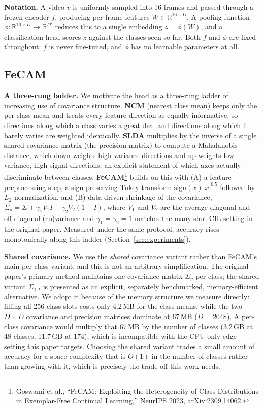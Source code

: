 \documentclass[11pt]{article}
\begin{document}
\textbf{Notation.} A video $v$ is uniformly sampled into 16 frames and
passed through a frozen encoder $f$, producing per-frame features
$W \in \mathbb{R}^{16 \times D}$. A pooling function
$\phi : \mathbb{R}^{16 \times D} \to \mathbb{R}^{D'}$ reduces this to a
single embedding $z = \phi(W)$, and a classification head scores $z$ against
the classes seen so far. Both $f$ and $\phi$ are fixed throughout: $f$ is
never fine-tuned, and $\phi$ has no learnable parameters at all.

\subsection{FeCAM}
\label{sec:method-fecam}

\textbf{A three-rung ladder.} We motivate the head as a three-rung ladder of increasing use of covariance
structure. \textbf{NCM} (nearest class mean) keeps only the per-class mean
and treats every feature direction as equally informative, so directions
along which a class varies a great deal and directions along which it barely
varies are weighted identically. \textbf{SLDA} multiplies by the inverse of
a single shared covariance matrix (the precision matrix) to compute a
Mahalanobis distance, which down-weights high-variance directions and
up-weights low-variance, high-signal directions: an explicit statement of
which axes actually discriminate between classes.
\textbf{FeCAM}\footnote{Goswami et al., ``FeCAM: Exploiting the
Heterogeneity of Class Distributions in Exemplar-Free Continual Learning,''
NeurIPS 2023, arXiv:2309.14062.} builds on this with (A) a feature
preprocessing step, a sign-preserving Tukey transform
$\mathrm{sign}(x)|x|^{0.5}$ followed by $L_2$ normalization, and (B)
data-driven shrinkage of the covariance,
$\Sigma_s = \Sigma + \gamma_1 V_1 I + \gamma_2 V_2 (1-I)$, where $V_1$ and
$V_2$ are the average diagonal and off-diagonal (co)variance and
$\gamma_1=\gamma_2=1$ matches the many-shot CIL setting in the original
paper. Measured under the same protocol, accuracy rises monotonically
along this ladder (Section~\ref{sec:experiments}).

\textbf{Shared covariance.} We use the \emph{shared} covariance variant rather than FeCAM's main
per-class variant, and this is not an arbitrary simplification. The
original paper's primary method maintains one covariance matrix $\Sigma_y$
per class; the shared variant $\Sigma_{1:t}$ is presented as an explicit,
separately benchmarked, memory-efficient alternative. We adopt it because of
the memory structure we measure directly: filling all 256 class slots costs
only 4.2\,MB for the class means, while the two $D \times D$ covariance and
precision matrices dominate at 67\,MB ($D{=}2048$). A per-class covariance
would multiply that 67\,MB by the number of classes (3.2\,GB at 48 classes,
11.7\,GB at 174), which is incompatible with the CPU-only edge setting this
paper targets. Choosing the shared variant trades a small amount of
accuracy for a space complexity that is $O(1)$ in the number of classes
rather than growing with it, which is precisely the trade-off this work
needs.
\end{document}
